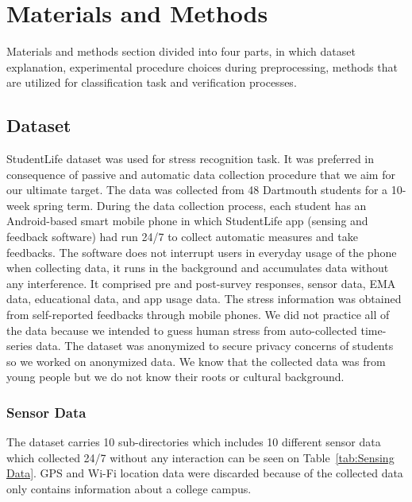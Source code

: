\documentclass[12pt,oneandhalf,chaparabic,lfm,phd,eng,oneside,pntc]{gsufbe}
\begin{document}
\chapter{Materials and Methods}
\label{chap:Materials and Methods}
Materials and methods section divided into four parts, in which dataset explanation, experimental procedure choices during preprocessing, methods that are utilized for classification task and verification processes.

\section{Dataset}
\label{sec:Dataset}
StudentLife dataset \cite{wang2014studentlife} was used for stress recognition task. It was preferred in consequence of passive and automatic data collection procedure that we aim for our ultimate target. The data was collected from 48 Dartmouth students for a 10-week spring term. During the data collection process, each student has an Android-based smart mobile phone in which StudentLife app (sensing and feedback software) had run 24/7 to collect automatic measures and take feedbacks. The software does not interrupt users in everyday usage of the phone when collecting data, it runs in the background and accumulates data without any interference. It comprised pre and post-survey responses, sensor data, EMA data, educational data, and app usage data. The stress information was obtained from self-reported feedbacks through mobile phones. We did not practice all of the data because we intended to guess human stress from auto-collected time-series data. The dataset was anonymized to secure privacy concerns of students so we worked on anonymized data. We know that the collected data was from young people but we do not know their roots or cultural background.

\subsection{Sensor Data}
\label{subsec:Sensor Data}
The dataset carries 10 sub-directories which includes 10 different sensor data which collected 24/7 without any interaction can be seen on Table~\ref{tab:Sensing Data}. GPS and Wi-Fi location data were discarded because of the collected data only contains information about a college campus. 
\end{document}
